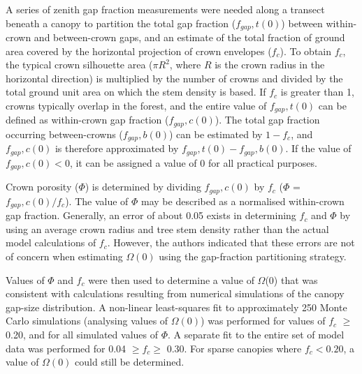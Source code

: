 \documentclass[a4paper,11pt]{report}
\begin{document}
A series of zenith gap fraction measurements were needed along a transect beneath a canopy to partition the total gap fraction ($f_{gap},t(0)$) between within-crown and between-crown gaps, and  an estimate of the total fraction of ground area covered by the horizontal projection of crown envelopes ($f_c$). To obtain $f_c$, the typical crown silhouette area ($\pi R^2$, where $R$ is the crown radius in the horizontal direction) is multiplied by the number of crowns and divided by the total ground unit area on which the stem density is based. If $f_c$ is greater than 1, crowns typically overlap in the forest, and the entire value of $f_{gap},t(0)$ can be defined as within-crown gap fraction ($f_{gap},c(0)$). The total gap fraction occurring between-crowns ($f_{gap},b(0)$) can be estimated by $1 - f_c$, and $f_{gap},c(0)$ is therefore approximated by $f_{gap},t(0) - f_{gap},b(0)$. If the value of $f_{gap},c(0) < 0$, it can be assigned a value of 0 for all practical purposes. 

Crown porosity ($\Phi$) is determined by dividing $f_{gap},c(0)$ by $f_c$ ($\Phi$ = $f_{gap},c(0)/f_c$). The value of $\Phi$ may be described as a normalised within-crown gap fraction. Generally, an error of about 0.05 exists in determining $f_c$ and $\Phi$ by using an average crown radius and tree stem density rather than the actual model calculations of $f_c$. However, the authors indicated that these errors are not of concern when estimating $\Omega(0)$ using the gap-fraction partitioning strategy.

Values of $\Phi$ and $f_c$ were then used to determine a value of $\Omega$(0) that was consistent with calculations resulting from numerical simulations of the canopy gap-size distribution. A non-linear least-squares fit to approximately 250 Monte Carlo simulations (analysing values of $\Omega(0)$) was performed for values of $f_c$ $\geq$ 0.20, and for all simulated values of $\Phi$. A separate fit to the entire set of model data was performed for 0.04 $\geq f_c \geq$ 0.30. For sparse canopies where $f_c < 0.20$, a value of $\Omega(0)$ could still be determined. 
\end{document}
